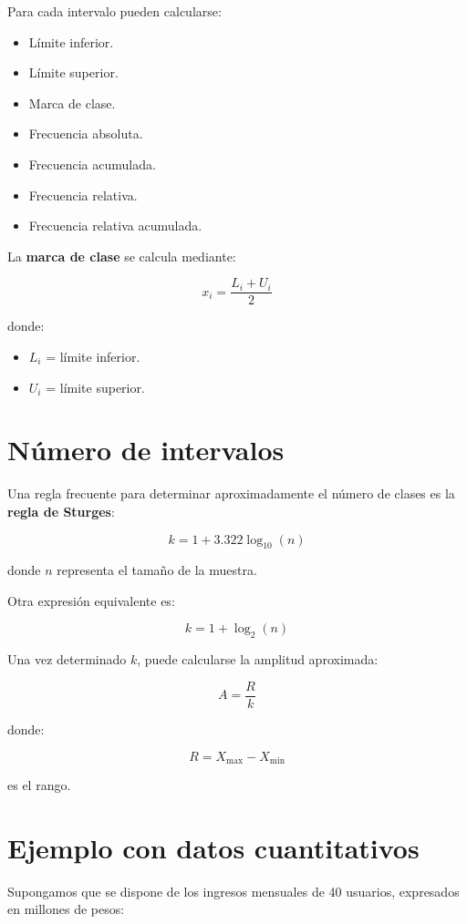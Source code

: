 \documentclass[
  spanish,
  14pt,
  letterpaper,
  DIV=11,
  numbers=noendperiod]{scrartcl}
\providecommand{\tightlist}{%
  \setlength{\itemsep}{0pt}\setlength{\parskip}{0pt}}
\begin{document}
Para cada intervalo pueden calcularse:

\begin{itemize}
\tightlist
\item
  Límite inferior.
\item
  Límite superior.
\item
  Marca de clase.
\item
  Frecuencia absoluta.
\item
  Frecuencia acumulada.
\item
  Frecuencia relativa.
\item
  Frecuencia relativa acumulada.
\end{itemize}

La \textbf{marca de clase} se calcula mediante:

\[
x_i=\frac{L_i+U_i}{2}
\]

donde:

\begin{itemize}
\tightlist
\item
  \(L_i\) = límite inferior.
\item
  \(U_i\) = límite superior.
\end{itemize}

\section{Número de intervalos}\label{nuxfamero-de-intervalos}

Una regla frecuente para determinar aproximadamente el número de clases
es la \textbf{regla de Sturges}:

\[
k=1+3.322\log_{10}(n)
\]

donde \(n\) representa el tamaño de la muestra.

Otra expresión equivalente es:

\[
k=1+\log_2(n)
\]

Una vez determinado \(k\), puede calcularse la amplitud aproximada:

\[
A=\frac{R}{k}
\]

donde:

\[
R=X_{\max}-X_{\min}
\]

es el rango.

\section{Ejemplo con datos
cuantitativos}\label{ejemplo-con-datos-cuantitativos}

Supongamos que se dispone de los ingresos mensuales de 40 usuarios,
expresados en millones de pesos:
\end{document}
